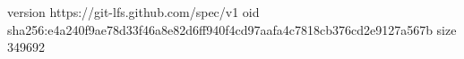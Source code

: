 version https://git-lfs.github.com/spec/v1
oid sha256:e4a240f9ae78d33f46a8e82d6ff940f4cd97aafa4c7818cb376cd2e9127a567b
size 349692
